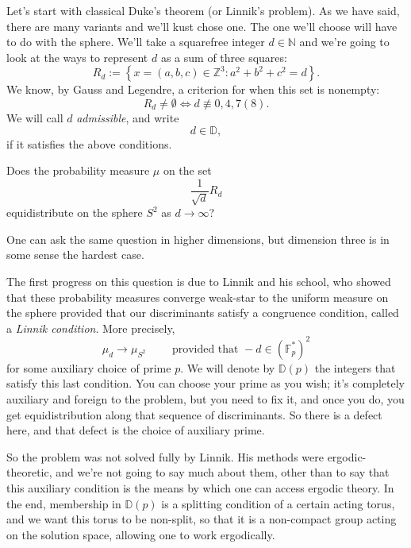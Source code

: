 \documentclass[reqno]{amsart} 
\begin{document}
Let's start with classical Duke's theorem (or Linnik's problem).  As we have said, there are many variants and we'll kust chose one.  The one we'll choose will have to do with the sphere.  We'll take a squarefree integer $d \in \mathbb{N} $ and we're going to look at the ways to represent $d$ as a sum of three squares:
\begin{equation*}
  R_d := \left\{ x = (a,b,c) \in \mathbb{Z}^3 : a^2 + b^2 + c^2 = d \right\}.
\end{equation*}
We know, by Gauss and Legendre, a criterion for when this set is nonempty:
\begin{equation*}
  R_d \neq \emptyset \iff
  d \not\equiv 0,4,7 (8).
\end{equation*}
We will call $d$ \emph{admissible}, and write
\begin{equation*}
  d \in \mathbb{D},
\end{equation*}
if it satisfies the above conditions.
\begin{question}
  Does the probability measure $\mu$ on the set
  \begin{equation*}
    \frac{1}{\sqrt{d}}R_d
  \end{equation*}
  equidistribute on the sphere $S^2$ as $d \rightarrow \infty $?
\end{question}
\begin{remark}
  One can ask the same question in higher dimensions, but dimension three is in some sense the hardest case.
\end{remark}
The first progress on this question is due to Linnik and his school, who showed that these probability measures converge weak-star to the uniform measure on the sphere provided that our discriminants satisfy a congruence condition, called a \emph{Linnik condition}.  More precisely,
\begin{equation*}
  \mu_d \rightarrow \mu_{S^2}
  \qquad \text{ provided that }
  - d \in (\mathbb{F}_p^\ast )^2
\end{equation*}
for some auxiliary choice of prime $p$.  We will denote by $\mathbb{D} (p)$ the integers that satisfy this last condition.  You can choose your prime as you wish; it's completely auxiliary and foreign to the problem, but you need to fix it, and once you do, you get equidistribution along that sequence of discriminants.  So there is a defect here, and that defect is the choice of auxiliary prime.

So the problem was not solved fully by Linnik.  His methods were ergodic-theoretic, and we're not going to say much about them, other than to say that this auxiliary condition is the means by which one can access ergodic theory.  In the end, membership in $\mathbb{D} (p)$ is a splitting condition of a certain acting torus, and we want this torus to be non-split, so that it is a non-compact group acting on the solution space, allowing one to work ergodically.
\end{document}
